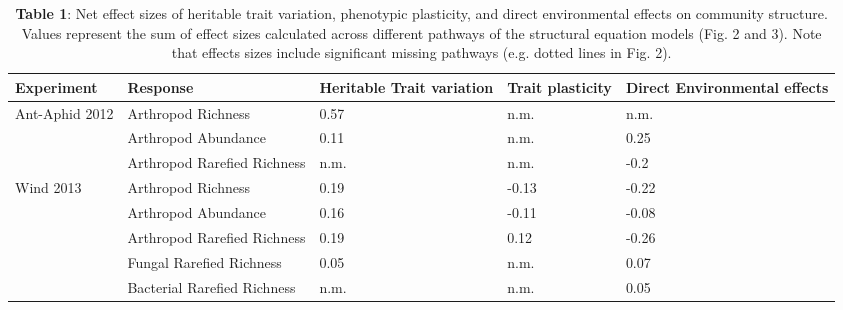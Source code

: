 \begin{table}[]
\centering
\caption{\textbf{Table 1}: Net effect sizes of heritable trait variation, phenotypic plasticity, and direct environmental effects on community structure. Values represent the sum of effect sizes calculated across different pathways of the structural equation models (Fig. 2 and 3). Note that effects sizes include significant missing pathways (e.g. dotted lines in Fig. 2).}
\label{table}
\begin{tabular}{@{}lllll@{}}
\toprule
Experiment                      & Response                    & Heritable Trait variation & Trait plasticity & Direct Environmental effects \\ \midrule
\multirow{3}{*}{Ant-Aphid 2012} & Arthropod Richness          & 0.57                      & n.m.             & n.m.                         \\
                                & Arthropod Abundance         & 0.11                      & n.m.             & 0.25                         \\
                                & Arthropod Rarefied Richness & n.m.                      & n.m.             & -0.2                         \\
\multirow{5}{*}{Wind 2013}      & Arthropod Richness          & 0.19                      & -0.13            & -0.22                        \\
                                & Arthropod Abundance         & 0.16                      & -0.11            & -0.08                        \\
                                & Arthropod Rarefied Richness & 0.19                      & 0.12             & -0.26                        \\
                                & Fungal Rarefied Richness    & 0.05                      & n.m.             & 0.07                         \\
                                & Bacterial Rarefied Richness & n.m.                      & n.m.             & 0.05                         \\ \cmidrule(l){2-5} 
\end{tabular}
\end{table}